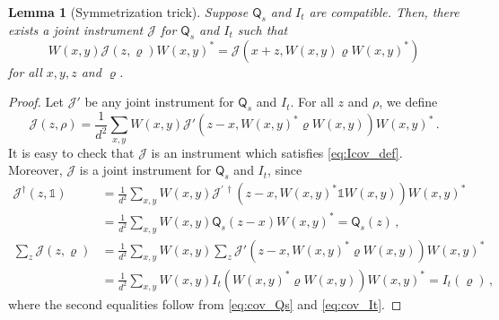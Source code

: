 \documentclass[12pt,reqno]{amsart}
\newtheorem{lemma}{Lemma}
\theoremstyle{definition}
\newcommand{\id}{\mathds{1}} %
\newcommand{\Qo}{\mathsf{Q}}%
\newcommand{\rhoo}{\varrho} %
\newcommand{\ii}{\mathcal{J}}
\begin{document}
\begin{lemma}[Symmetrization trick]\label{lem:trick}
Suppose $\Qo_s$ and $I_t$ are compatible. Then, there exists a joint instrument $\ii$ for $\Qo_s$ and $I_t$ such that
\begin{equation}\label{eq:Icov_def}
W(x,y)\ii(z,\rhoo)W(x,y)^* = \ii(x+z,W(x,y)\rhoo W(x,y)^*)
\end{equation}
for all $x,y,z$ and $\rhoo$.
\end{lemma}
\begin{proof}
Let $\ii'$ be any joint instrument for $\Qo_s$ and $I_t$. For all $z$ and $\rho$, we define
$$
\ii(z,\rho) = \frac{1}{d^2} \sum_{x,y} W(x,y)\ii'(z-x,W(x,y)^*\rhoo W(x,y))W(x,y)^*\,.
$$
It is easy to check that $\ii$ is an instrument which satisfies \eqref{eq:Icov_def}. Moreover, $\ii$ is a joint instrument for $\Qo_s$ and $I_t$, since
\begin{align*}
\ii^\dag(z,\id) & = \frac{1}{d^2} \sum_{x,y} W(x,y)\ii^{\prime\,\dag}(z-x,W(x,y)^*\id W(x,y))W(x,y)^* \\
& = \frac{1}{d^2} \sum_{x,y} W(x,y)\Qo_s(z-x)W(x,y)^* = \Qo_s(z)\,, \\
\sum_z\ii(z,\rhoo) & = \frac{1}{d^2} \sum_{x,y} W(x,y) \sum_z \ii'(z-x,W(x,y)^*\rhoo W(x,y))W(x,y)^* \\
& = \frac{1}{d^2} \sum_{x,y} W(x,y)I_t(W(x,y)^*\rhoo W(x,y))W(x,y)^* = I_t(\rhoo)\,,
\end{align*}
where the second equalities follow from \eqref{eq:cov_Qs} and \eqref{eq:cov_It}.
\end{proof}
\end{document}
